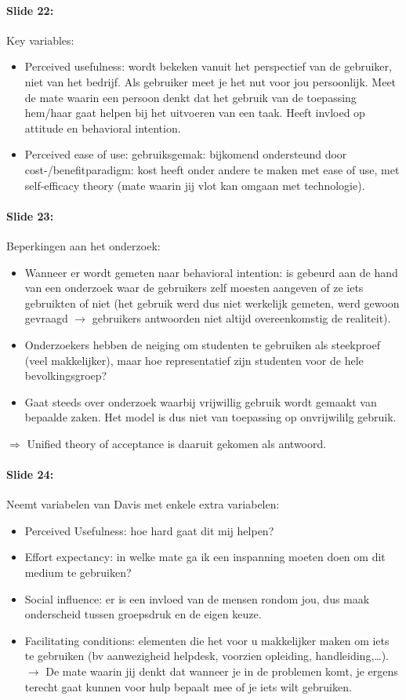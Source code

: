 \documentclass[10pt,a4paper]{report}
\begin{document}
\paragraph{Slide 22:}Key variables:
\begin{itemize}
\item Perceived usefulness: wordt bekeken vanuit het perspectief van de gebruiker, niet van het bedrijf. Als gebruiker meet je het nut voor jou persoonlijk. Meet de mate waarin een persoon denkt dat het gebruik van de toepassing hem/haar gaat helpen bij het uitvoeren van een taak. Heeft invloed op attitude en behavioral intention.
\item Perceived ease of use: gebruiksgemak: bijkomend ondersteund door cost-/benefitparadigm: kost heeft onder andere te maken met ease of use, met self-efficacy theory (mate waarin jij vlot kan omgaan met technologie).
\end{itemize}

\paragraph{Slide 23:}Beperkingen aan het onderzoek:
\begin{itemize}
\item Wanneer er wordt gemeten naar behavioral intention: is gebeurd aan de hand van een onderzoek waar de gebruikers zelf moesten aangeven of ze iets gebruikten of niet (het gebruik werd dus niet werkelijk gemeten, werd gewoon gevraagd $\rightarrow$ gebruikers antwoorden niet altijd overeenkomstig de realiteit).
\item Onderzoekers hebben de neiging om studenten te gebruiken als steekproef (veel makkelijker), maar hoe representatief zijn studenten voor de hele bevolkingsgroep?
\item Gaat steeds over onderzoek waarbij vrijwillig gebruik wordt gemaakt van bepaalde zaken. Het model is dus niet van toepassing op onvrijwililg gebruik.
\end{itemize}
$\Rightarrow$ Unified theory of acceptance is daaruit gekomen als antwoord.

\paragraph{Slide 24:}Neemt variabelen van Davis met enkele extra variabelen:
\begin{itemize}
\item Perceived Usefulness: hoe hard gaat dit mij helpen?
\item Effort expectancy: in welke mate ga ik een inspanning moeten doen om dit medium te gebruiken?
\item Social influence: er is een invloed van de mensen rondom jou, dus maak onderscheid tussen groepsdruk en de eigen keuze.
\item Facilitating conditions: elementen die het voor u makkelijker maken om iets te gebruiken (bv aanwezigheid helpdesk, voorzien opleiding, handleiding,…). $\rightarrow$ De mate waarin jij denkt dat wanneer je in de problemen komt, je ergens terecht gaat kunnen voor hulp bepaalt mee of je iets wilt gebruiken.
\end{itemize}
\end{document}
